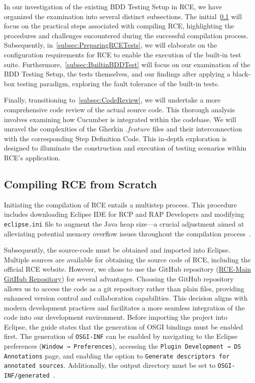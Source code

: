 \label{sec:examination}
In our investigation of the existing BDD Testing Setup in \ac{RCE}, we have organized the examination into several distinct subsections. The initial~\cref{subsec:BuildingRCE} will focus on the practical steps associated with compiling \ac{RCE}, highlighting the procedures and challenges encountered during the successful compilation process. Subsequently, in~\cref{subsec:PreparingRCETests}, we will elaborate on the configuration requirements for \ac{RCE} to enable the execution of the built-in test suite. Furthermore,~\cref{subsec:BuiltinBDDTest} will focus on our examination of the BDD Testing Setup, the tests themselves, and our findings after applying a black-box testing paradigm, exploring the fault tolerance of the built-in tests.

Finally, transitioning to~\cref{subsec:CodeReview}, we will undertake a more comprehensive code review of the actual source code. This thorough analysis involves examining how Cucumber is integrated within the codebase. We will unravel the complexities of the Gherkin $.feature$ files and their interconnection with the corresponding Step Definition Code. This in-depth exploration is designed to illuminate the construction and execution of testing scenarios within \ac{RCE}'s application.

\subsection{Compiling \ac{RCE} from Scratch}
\label{subsec:BuildingRCE}
Initiating the compilation of \ac{RCE} entails a multistep process. This procedure includes downloading Eclipse IDE for RCP and RAP Developers and modifying \texttt{eclipse.ini} file to augment the Java heap size—a crucial adjustment aimed at alleviating potential memory overflow issues throughout the compilation process~\cite{rceDevGuide10x}.

Subsequently, the source-code must be obtained and imported into Eclipse. Multiple sources are available for obtaining the source code of \ac{RCE}, including the official RCE website. However, we chose to use the GitHub repository (\href{https://github.com/rcenvironment/rce-main}{RCE-Main GitHub Repository}) for several advantages. Choosing the GitHub repository allows us to access the code as a git repository rather than plain files, providing enhanced version control and collaboration capabilities. This decision aligns with modern development practices and facilitates a more seamless integration of the code into our development environment. Before importing the project into Eclipse, the guide states that the generation of OSGI bindings must be enabled first. The generation of \texttt{OSGI-INF} can be enabled by navigating to the Eclipse preferences (\texttt{Window → Preferences}), accessing the \texttt{Plugin Development → DS Annotations} page, and enabling the option to \texttt{Generate descriptors for annotated sources}. Additionally, the output directory must be set to \texttt{OSGI-INF/generated}~\cite{rceDevGuide10x}.

